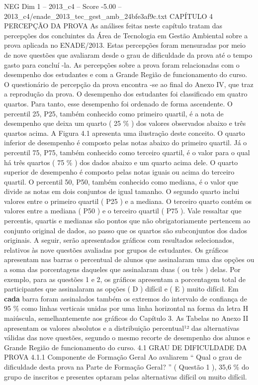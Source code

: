 \begin{textsample}{NEG Dim 1 – 2013\_c4 – Score -5.00 – 2013\_c4/enade\_2013\_tec\_gest\_amb\_24bfe3af9c.txt}  \label{ex:f1_neg_055}
CAPÍTULO 4 PERCEPÇÃO DA PROVA As análises feitas neste capítulo tratam das percepções dos concluintes da Área de Tecnologia em Gestão Ambiental sobre a prova aplicada no ENADE/2013.
Estas percepções foram mensuradas por meio de nove questões que avaliaram desde o grau de dificuldade da prova até o tempo gasto para concluí -la.
As percepções sobre a prova foram relacionadas com o desempenho dos estudantes e com a Grande Região de funcionamento do curso.
O questionário de percepção da prova encontra -se ao final do Anexo IV, que traz a reprodução da prova.
O desempenho dos estudantes foi classificado em quatro quartos.
Para tanto, esse desempenho foi ordenado de forma ascendente.
O percentil 25, P25, também conhecido como primeiro quartil, é a nota de desempenho que deixa um quarto ( 25 \% ) dos valores observados abaixo e três quartos acima.
A Figura 4.1 apresenta uma ilustração deste conceito.
O quarto inferior de desempenho é composto pelas notas abaixo do primeiro quartil.
Já o percentil 75, P75, também conhecido como terceiro quartil, é o valor para o qual há três quartos ( 75 \% ) dos dados abaixo e um quarto acima dele.
O quarto superior de desempenho é composto pelas notas iguais ou acima do terceiro quartil.
O percentil 50, P50, também conhecido como mediana, é o valor que divide as notas em dois conjuntos de igual tamanho.
O segundo quarto inclui valores entre o primeiro quartil ( P25 ) e a mediana.
O terceiro quarto contém os valores entre a mediana ( P50 ) e o terceiro quartil ( P75 ).
Vale ressaltar que percentis, quartis e medianas são pontos que não obrigatoriamente pertencem ao conjunto original de dados, ao passo que os quartos são subconjuntos dos dados originais.
A seguir, serão apresentados gráficos com resultados selecionados, relativos às nove questões avaliadas por grupos de estudantes.
Os gráficos apresentam nas barras o percentual de alunos que assinalaram uma das opções ou a soma das porcentagens daqueles que assinalaram duas ( ou três ) delas.
Por exemplo, para as questões 1 e 2, os gráficos apresentam a porcentagem total de participantes que assinalaram as opções ( D ) difícil e ( E ) muito difícil.
Em \textbf{cada} barra foram assinalados também os extremos do intervalo de confiança de 95 \% como linhas verticais unidas por uma linha horizontal na forma da letra H maiúscula, semelhantemente aos gráficos do Capítulo 3.
As Tabelas no Anexo II apresentam os valores absolutos e a distribuição percentual¹² das alternativas válidas das nove questões, segundo o mesmo recorte de desempenho dos alunos e Grande Região de funcionamento do curso. 4.1 GRAU DE DIFICULDADE DA PROVA 4.1.1 Componente de Formação Geral Ao avaliarem “ Qual o grau de dificuldade desta prova na Parte de Formação Geral? ” ( Questão 1 ), 35,6 \% do grupo de inscritos e presentes optaram pelas alternativas difícil ou muito difícil.

\end{textsample}
